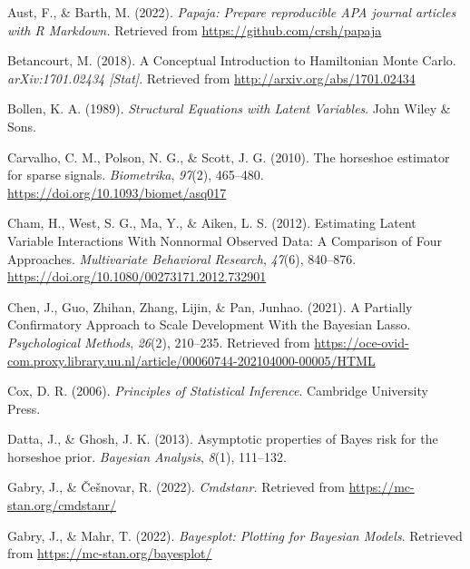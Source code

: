 \documentclass[
  man, donotrepeattitle,floatsintext]{apa6}
\newlength{\cslhangindent}
\newenvironment{CSLReferences}[2] %
 {\begin{list}{}{%
  \setlength{\itemindent}{0pt}
  \setlength{\leftmargin}{0pt}
  \setlength{\parsep}{0pt}
  \ifodd #1
   \setlength{\leftmargin}{\cslhangindent}
   \setlength{\itemindent}{-1\cslhangindent}
  \fi
  \setlength{\itemsep}{#2\baselineskip}}}
 {\end{list}}
\begin{document}
\label{refs}
\begin{CSLReferences}{1}{0}
Aust, F., \& Barth, M. (2022). \emph{Papaja: {Prepare} reproducible {APA} journal articles with {R} {Markdown}.} Retrieved from \url{https://github.com/crsh/papaja}

Betancourt, M. (2018). A {Conceptual} {Introduction} to {Hamiltonian} {Monte} {Carlo}. \emph{arXiv:1701.02434 {[}Stat{]}}. Retrieved from \url{http://arxiv.org/abs/1701.02434}

Bollen, K. A. (1989). \emph{Structural {Equations} with {Latent} {Variables}}. John Wiley \& Sons.

Carvalho, C. M., Polson, N. G., \& Scott, J. G. (2010). The horseshoe estimator for sparse signals. \emph{Biometrika}, \emph{97}(2), 465--480. \url{https://doi.org/10.1093/biomet/asq017}

Cham, H., West, S. G., Ma, Y., \& Aiken, L. S. (2012). Estimating {Latent} {Variable} {Interactions} {With} {Nonnormal} {Observed} {Data}: {A} {Comparison} of {Four} {Approaches}. \emph{Multivariate Behavioral Research}, \emph{47}(6), 840--876. \url{https://doi.org/10.1080/00273171.2012.732901}

Chen, J., Guo, Zhihan, Zhang, Lijin, \& Pan, Junhao. (2021). A {Partially} {Confirmatory} {Approach} to {Scale} {Development} {With} the {Bayesian} {Lasso}. \emph{Psychological Methods}, \emph{26}(2), 210--235. Retrieved from \url{https://oce-ovid-com.proxy.library.uu.nl/article/00060744-202104000-00005/HTML}

Cox, D. R. (2006). \emph{Principles of {Statistical} {Inference}}. Cambridge University Press.

Datta, J., \& Ghosh, J. K. (2013). Asymptotic properties of {Bayes} risk for the horseshoe prior. \emph{Bayesian Analysis}, \emph{8}(1), 111--132.

Gabry, J., \& Češnovar, R. (2022). \emph{Cmdstanr.} Retrieved from \url{https://mc-stan.org/cmdstanr/}

Gabry, J., \& Mahr, T. (2022). \emph{Bayesplot: {Plotting} for {Bayesian} {Models}}. Retrieved from \url{https://mc-stan.org/bayesplot/}


\end{CSLReferences}
\end{document}
